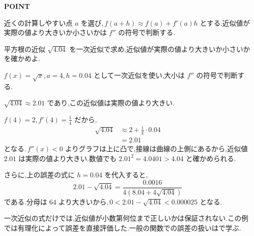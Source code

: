 \begin{bookpoint}
\textbf{POINT}\par
近くの計算しやすい点 $a$ を選び,\,$f(a+h)\approx f(a)+f'(a)h$ とする.近似値が実際の値より大きいか小さいかは $f''$ の符号で判断する.
\end{bookpoint}

\begin{example}{平方根の近似}
$\sqrt{4.04}$ を一次近似で求め,近似値が実際の値より大きいか小さいかを確かめよ.
\end{example}
$f(x)=\sqrt x$,\,$a=4$,\,$h=0.04$ として一次近似を使い,大小は $f''$ の符号で判断する.

$\sqrt{4.04}\approx2.01$ であり,この近似値は実際の値より大きい.

$f(4)=2$,\,$f'(4)=\frac14$ だから,
\begin{align*}
 \sqrt{4.04}&\approx2+\frac14\cdot0.04\\
 &=2.01
\end{align*}
となる.\,$f''(x)<0$ よりグラフは上に凸で,接線は曲線の上側にあるから,近似値 $2.01$ は実際の値より大きい.数値でも $2.01^2=4.0401>4.04$ と確かめられる.

さらに,上の誤差の式に $h=0.04$ を代入すると,
\[
 2.01-\sqrt{4.04}=\frac{0.0016}{4\left(8.04+4\sqrt{4.04}\right)}
\]
である.分母は $64$ より大きいから,\,$0<2.01-\sqrt{4.04}<0.000025$ となる.

一次近似の式だけでは,近似値が小数第何位まで正しいかは保証されない.この例では有理化によって誤差を直接評価した.一般の関数での誤差の扱いはで学ぶ.
